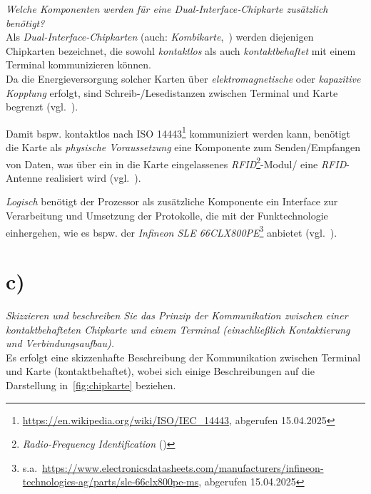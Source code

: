 \textit{Welche Komponenten werden für eine Dual‐Interface‐Chipkarte zusätzlich benötigt?}\\

\noindent
Als \textit{Dual-Interface-Chipkarten} (auch: \textit{Kombikarte},~\cite[4]{ITS5}) werden diejenigen Chipkarten bezeichnet, die sowohl \textit{kontaktlos} als auch \textit{kontaktbehaftet} mit einem Terminal kommunizieren können.\\
Da die Energieversorgung solcher Karten über \textit{elektromagnetische} oder \textit{kapazitive Kopplung} erfolgt, sind Schreib-/Lesedistanzen zwischen Terminal und Karte begrenzt (vgl.~\cite[27]{ITS5}).

\noindent
Damit bspw. kontaktlos nach ISO 14443\footnote{
    \url{https://en.wikipedia.org/wiki/ISO/IEC_14443}, abgerufen 15.04.2025
} kommuniziert werden kann, benötigt die Karte als \textit{physische Voraussetzung} eine Komponente zum Senden/Empfangen von Daten, was über ein in die Karte eingelassenes \textit{RFID}\footnote{
    \textit{Radio-Frequency Identification} (\cite[95 f.]{ITS5})
}-Modul/ eine \textit{RFID}-Antenne realisiert wird (vgl.~\cite[27]{ITS5}).

\noindent
\textit{Logisch} benötigt der Prozessor als zusätzliche Komponente ein Interface zur Verarbeitung und Umsetzung der Protokolle, die mit der Funktechnologie einhergehen, wie es bspw. der \textit{Infineon SLE 66CLX800PE}\footnote{
    s.a.~\url{https://www.electronicsdatasheets.com/manufacturers/infineon-technologies-ag/parts/sle-66clx800pe-ms}, abgerufen 15.04.2025
}  anbietet (vgl.~\cite[11]{ITS5}).

\section{c)}

\textit{Skizzieren und beschreiben Sie das Prinzip der Kommunikation zwischen einer
kontaktbehafteten Chipkarte und einem Terminal (einschließlich Kontaktierung
und Verbindungsaufbau).}\\

\noindent
Es erfolgt eine skizzenhafte Beschreibung der Kommunikation zwischen Terminal und Karte (kontaktbehaftet), wobei sich einige Beschreibungen auf die Darstellung in~\ref{fig:chipkarte} beziehen.\\

